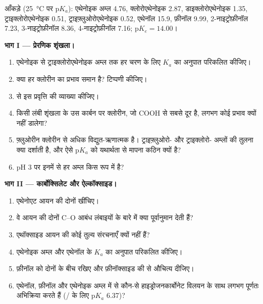 \begin{problem}
\label{pb:b1:electronic-effects:1}
आँकड़े (\qty{25}{\celsius} पर $\mathrm{p}K_a$): एथेनोइक अम्ल 4.76,
क्लोरोएथेनोइक 2.87, डाइक्लोरोएथेनोइक 1.35, ट्राइक्लोरोएथेनोइक 0.51,
ट्राइफ़्लुओरोएथेनोइक 0.52, एथेनॉल 15.9, फ़ीनॉल 9.99, 2-नाइट्रोफ़ीनॉल 7.23,
3-नाइट्रोफ़ीनॉल 8.36, 4-नाइट्रोफ़ीनॉल 7.16; $\mathrm{p}K_e = 14.00$।

\medskip
\noindent\textbf{भाग I --- प्रेरणिक शृंखला।}
\begin{enumerate}
  \item एथेनोइक से ट्राइक्लोरोएथेनोइक अम्ल तक हर चरण के लिए $K_a$ का अनुपात
        परिकलित कीजिए।
  \item क्या हर क्लोरीन का प्रभाव समान है? टिप्पणी कीजिए।
  \item {} से इस प्रवृत्ति की व्याख्या कीजिए।
  \item किसी लंबी शृंखला के उस कार्बन पर क्लोरीन, जो COOH से सबसे दूर है,
        लगभग कोई प्रभाव क्यों नहीं डालेगा?
  \item फ़्लुओरीन क्लोरीन से अधिक विद्युत-ऋणात्मक है। ट्राइफ़्लुओरो- और ट्राइक्लोरो- अम्लों की
        तुलना क्या दर्शाती है, और ऐसे $\mathrm{p}K_a$ को यथार्थता से मापना
        कठिन क्यों है?
  \item pH 3 पर इनमें से हर अम्ल किस रूप में है?
\end{enumerate}

\medskip
\noindent\textbf{भाग II --- कार्बोक्सिलेट और ऐल्कॉक्साइड।}
\begin{enumerate}[resume]
  \item एथेनोएट आयन की दोनों  खींचिए।
  \item वे आयन की दोनों C--O आबंध लंबाइयों के बारे में क्या पूर्वानुमान देती हैं?
  \item एथॉक्साइड आयन की कोई तुल्य संरचनाएँ क्यों नहीं हैं?
  \item एथेनोइक अम्ल और एथेनॉल के $K_a$ का अनुपात परिकलित कीजिए।
  \item फ़ीनॉल को दोनों के बीच रखिए और फ़ीनॉक्साइड की  से औचित्य दीजिए।
  \item एथेनॉल, फ़ीनॉल और एथेनोइक अम्ल में से कौन-से हाइड्रोजनकार्बोनेट विलयन के साथ
        लगभग पूर्णतः अभिक्रिया करते हैं (/ के लिए
        $\mathrm{p}K_a$ 6.37)?
\end{enumerate}


\end{problem}
